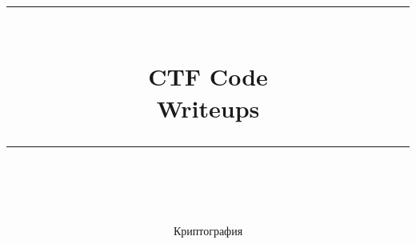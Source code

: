\documentclass[idxtotoc,hyperref,openany,oneside]{files/crypto} %
\newcommand{\HRule}{\rule{\linewidth}{0.5mm}} %
\begin{document}

\frontmatter %
\title{
\begin{center}
\HRule \\[0.4cm]
{\Huge \bfseries CTF Code \\[0.5cm] \Large Writeups}\\[0.4cm] %
\HRule \\[1.5cm]
\end{center}
}
\author{\Huge Криптография \\ \\[2cm]} %
\maketitle

\tableofcontents

\mainmatter %











\end{document}
